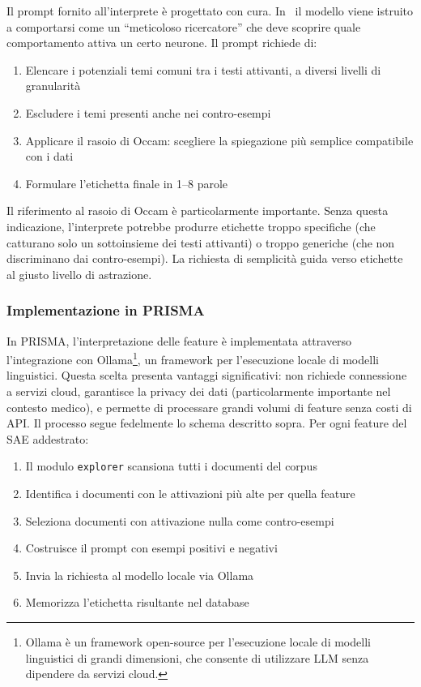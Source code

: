 Il prompt fornito all'interprete è progettato con cura. In~\parencite{oneill2024disentangling} il modello viene istruito a comportarsi come un ``meticoloso ricercatore'' che deve scoprire quale comportamento attiva un certo neurone. Il prompt richiede di:
\begin{enumerate}
    \item Elencare i potenziali temi comuni tra i testi attivanti, a diversi livelli di granularità
    \item Escludere i temi presenti anche nei contro-esempi
    \item Applicare il rasoio di Occam: scegliere la spiegazione più semplice compatibile con i dati
    \item Formulare l'etichetta finale in 1--8 parole
\end{enumerate}
Il riferimento al rasoio di Occam è particolarmente importante. Senza questa indicazione, l'interprete potrebbe produrre etichette troppo specifiche (che catturano solo un sottoinsieme dei testi attivanti) o troppo generiche (che non discriminano dai contro-esempi). La richiesta di semplicità guida verso etichette al giusto livello di astrazione.
\subsubsection{Implementazione in PRISMA}
\label{subsubsec:prisma_interpreter}
In PRISMA, l'interpretazione delle feature è implementata attraverso l'integrazione con Ollama\footnote{Ollama è un framework open-source per l'esecuzione locale di modelli linguistici di grandi dimensioni, che consente di utilizzare LLM senza dipendere da servizi cloud.}, un framework per l'esecuzione locale di modelli linguistici. Questa scelta presenta vantaggi significativi: non richiede connessione a servizi cloud, garantisce la privacy dei dati (particolarmente importante nel contesto medico), e permette di processare grandi volumi di feature senza costi di API.
Il processo segue fedelmente lo schema descritto sopra. Per ogni feature del SAE addestrato:
\begin{enumerate}
    \item Il modulo \texttt{explorer} scansiona tutti i documenti del corpus
    \item Identifica i documenti con le attivazioni più alte per quella feature
    \item Seleziona documenti con attivazione nulla come contro-esempi
    \item Costruisce il prompt con esempi positivi e negativi
    \item Invia la richiesta al modello locale via Ollama
    \item Memorizza l'etichetta risultante nel database
\end{enumerate}


